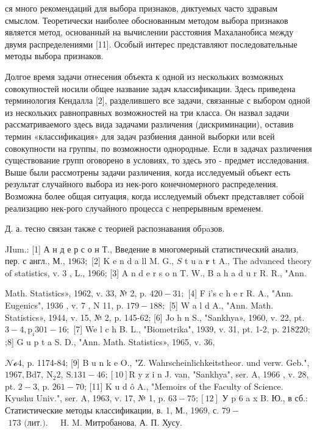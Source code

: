 \documentclass[10pt]{article}
\begin{document}
ся много рекомендаций для выбора признаков, диктуемых часто здравым смыслом. Теоретически наиболее обоснованным методом выбора признаков является метод, основанный на вычислении расстояния Махаланобиса между двумя распределениями [11]. Особый интерес представляют последовательные методы выбора признаков.



Долгое время задачи отнесения объекта к одной из нескольких возможных совокупностей носили общее название задач классификации. Здесь приведена терминология Кендалла [2], разделившего все задачи, связанные с выбором одной из нескольких равноправных возможностей на три класса. Он назвал задачи рассматриваемого здесь вида задачами различения (дискриминации), оставив термин «классификация» для задач разбиения данной выборки или всей совокупности на группы, по возможности однородные. Если в задачах различения существование групп оговорено в условиях, то здесь это - предмет исследования. Выше были рассмотрены задачи различения, когда исследуемый объект есть результат случайного выбора из нек-рого конечномерного распределения. Возможна более общая ситуация, когда исследуемый объект представляет собой реализацию нек-рого случайного процесса с непрерывным временем.



Д. а. тесно связан также с теорией распознавания обpaзов.



JIum.: [1] А н д е р с о н Т., Введение в многомерный статистический анализ, пер. с англ., М., $1963 ;$ [2] K e n d a ll M. G., $S$ t u a $\mathbf{r}$ t A., The advanced theory of statistics, v. 3 , L., 1966; [3] A n d e r s o n T. W., B a h a d u r R. R., "Ann.

Math. Statistics», 1962, v. 33, № 2, p. $420-31 ;$ [4] F i's c h e r R. A., "Ann. Eugenics", 1936 , v. 7 , N 11, p. $179-188 ;$ [5] W a l d A., "Ann. Math. Statistics», 1944, v. 15, № 2, p. 145-62; [6] Jo h n S., "Sankhya», 1960, v. 22, pt. $3-4, \mathrm{p}_{i} 301-16 ;$ [7] We l c h B. L., "Biometrika", 1939, v. 31, pt. 1-2, p. 218$220 ;$;8] G u p t a S. D., "Ann. Math. Statistics», 1965, v. 36,

$\mathcal{N o} 4$, p. 1174-84; [9] B u n k e O., "Z. Wahrscheinlichkeitstheor. und verw. Geb.", $1967, \mathrm{Bd} 7, \mathrm{~N}_{2} 2, \mathrm{~S} .131-46 ;[10] \mathrm{R}$ y z i $\mathrm{n}$ J. van, "Sankhya", ser. A, 1966 , v. 28, pt. $2-3$, p. $261-70$; [11] K u d ô A., "Memoirs of the Faculty of Science. Kyushu Univ.", ser. A, 1963, v. 17, № 1, p. $63-75 ;[12]$ У p 6 a x B. Ю., в сб.: Статистические методы классификации, в. 1, М., 1969, с. $79-$ $\begin{array}{ll}173 \text { (лит.). } & \text { H. M. Митробанова, А. П. Хусу. }\end{array}$
\end{document}
